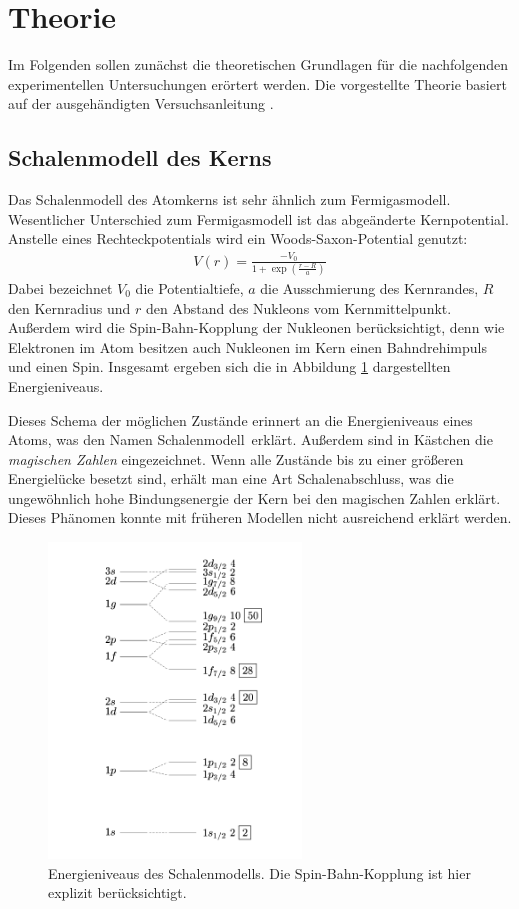 \section{Theorie}
	
Im Folgenden sollen zunächst die theoretischen Grundlagen für die nachfolgenden experimentellen Untersuchungen erörtert werden.
Die vorgestellte Theorie basiert auf der ausgehändigten Versuchsanleitung \cite{wwu}.

\subsection{Schalenmodell des Kerns}

Das Schalenmodell des Atomkerns ist sehr ähnlich zum Fermigasmodell. Wesentlicher Unterschied zum Fermigasmodell ist das abgeänderte Kernpotential. Anstelle eines Rechteckpotentials wird ein Woods-Saxon-Potential genutzt:
\begin{align*}
	V(r)=\frac{-V_0}{1+\exp\left( \frac{r-R}{a}\right) }
\end{align*}
Dabei bezeichnet $V_0$ die Potentialtiefe, $a$ die Ausschmierung des Kernrandes, $R$ den Kernradius und $r$ den Abstand des Nukleons vom Kernmittelpunkt. Außerdem wird die Spin-Bahn-Kopplung der Nukleonen berücksichtigt, denn wie Elektronen im Atom besitzen auch Nukleonen im Kern einen Bahndrehimpuls und einen Spin. Insgesamt ergeben sich die in Abbildung \ref{schalen} dargestellten Energieniveaus. 

Dieses Schema der möglichen Zustände erinnert an die Energieniveaus eines Atoms, was den Namen \glqq Schalenmodell\grqq\ erklärt. Außerdem sind in Kästchen die \emph{magischen Zahlen} eingezeichnet. Wenn alle Zustände bis zu einer größeren Energielücke besetzt sind, erhält man eine Art \glqq Schalenabschluss\grqq, was die ungewöhnlich hohe Bindungsenergie der Kern bei den magischen Zahlen erklärt. Dieses Phänomen konnte mit früheren Modellen nicht ausreichend erklärt werden.

\begin{figure}[h]
	\centering
	\includegraphics[width=0.6\textwidth]{img/schalen}
	\caption{Energieniveaus des Schalenmodells. Die Spin-Bahn-Kopplung ist hier explizit berücksichtigt. \cite{schalen}}
	\label{schalen}
\end{figure}

